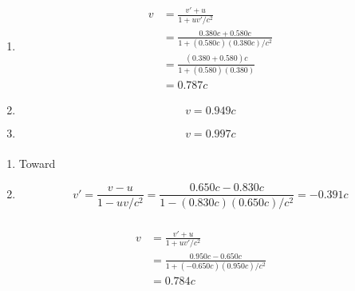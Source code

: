 \documentclass{article}
\begin{document}
\begin{enumerate}
  \item

        \begin{align*}
          v & = \frac{v' + u}{1 + u v' / c^2}                           \\
            & = \frac{0.380 c + 0.580 c}{1 + (0.580 c) (0.380 c) / c^2} \\
            & = \frac{(0.380 + 0.580) c}{1 + (0.580) (0.380)}           \\
            & = 0.787 c
        \end{align*}

  \item \[v = 0.949 c\]

  \item \[v = 0.997 c\]
\end{enumerate}

\setcounter{subsubsection}{16}
\subsubsection{}

\begin{enumerate}
  \item Toward

  \item \[v' = \frac{v - u}{1 - u v / c^2} = \frac{0.650 c - 0.830 c}{1 - (0.830 c) (0.650 c) / c^2} = -0.391 c\]
\end{enumerate}

\setcounter{subsubsection}{18}
\subsubsection{}

\begin{align*}
  v & = \frac{v' + u}{1 + u v' / c^2}                            \\
    & = \frac{0.950 c - 0.650 c}{1 + (-0.650 c) (0.950 c) / c^2} \\
    & = 0.784 c
\end{align*}

\setcounter{subsubsection}{20}
\subsubsection{}
\end{document}
